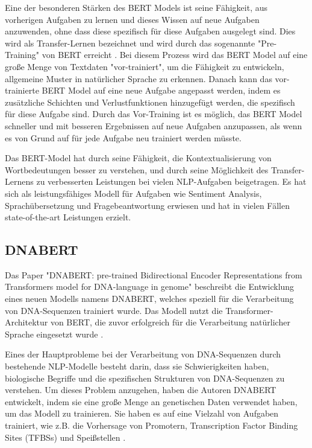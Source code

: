 \documentclass[oneside,bibliography=totocnumbered,BCOR=5mm]{scrbook}%
\theoremstyle{definition}
\theoremstyle{definition}
\theoremstyle{definition}
\theoremstyle{definition}
\theoremstyle{definition}
\theoremstyle{definition}
\begin{document}
Eine der besonderen Stärken des BERT Models ist seine Fähigkeit, aus vorherigen Aufgaben zu lernen und 
dieses Wissen auf neue Aufgaben anzuwenden, ohne dass diese spezifisch für diese Aufgaben ausgelegt sind. 
Dies wird als Transfer-Lernen bezeichnet und wird durch das sogenannte "Pre-Training" von BERT erreicht \autocite[Seite 3]{bert}. 
Bei diesem Prozess wird das BERT Model auf eine große Menge von Textdaten "vor-trainiert", 
um die Fähigkeit zu entwickeln, allgemeine Muster in natürlicher Sprache zu erkennen. 
Danach kann das vor-trainierte BERT Model auf eine neue Aufgabe angepasst werden, 
indem es zusätzliche Schichten und Verlustfunktionen hinzugefügt werden, die spezifisch für diese Aufgabe sind. 
Durch das Vor-Training ist es möglich, das BERT Model schneller und mit besseren Ergebnissen auf neue Aufgaben anzupassen, 
als wenn es von Grund auf für jede Aufgabe neu trainiert werden müsste.


Das BERT-Model hat durch seine Fähigkeit, die Kontextualisierung von Wortbedeutungen besser zu verstehen, 
und durch seine Möglichkeit des Transfer-Lernens
zu verbesserten Leistungen bei vielen NLP-Aufgaben beigetragen. 
Es hat sich als leistungsfähiges Modell für Aufgaben wie Sentiment Analysis, 
Sprachübersetzung und Fragebeantwortung erwiesen und hat in vielen Fällen state-of-the-art Leistungen erzielt.


\subsection{DNABERT}

Das Paper "DNABERT: pre-trained Bidirectional Encoder Representations from Transformers model 
for DNA-language in genome" beschreibt die Entwicklung eines neuen Modells namens DNABERT, 
welches speziell für die Verarbeitung von DNA-Sequenzen trainiert wurde. 
Das Modell nutzt die Transformer-Architektur von BERT, die zuvor erfolgreich für die Verarbeitung 
natürlicher Sprache eingesetzt wurde \autocite[Seite 2113]{dnabert}.


Eines der Hauptprobleme bei der Verarbeitung von DNA-Sequenzen durch bestehende NLP-Modelle 
besteht darin, dass sie Schwierigkeiten haben, 
biologische Begriffe und die spezifischen Strukturen von DNA-Sequenzen zu verstehen. 
Um dieses Problem anzugehen, haben die Autoren DNABERT entwickelt, 
indem sie eine große Menge an genetischen Daten verwendet haben, 
um das Modell zu trainieren. 
Sie haben es auf eine Vielzahl von Aufgaben trainiert, wie z.B. 
die Vorhersage von Promotern, Transcription Factor Binding
Sites (TFBSs) und Speißstellen \autocite[Seite 2114]{dnabert}.
\end{document}

